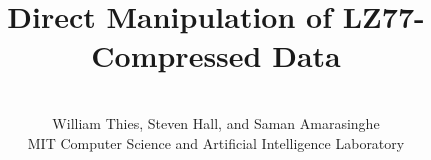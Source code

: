 \documentclass[12pt]{article}
\newcommand{\thirteenpoint}{\fontsize{13pt}{14pt}\selectfont}
\begin{document}


\title{\vspace{-40pt} \Large Direct Manipulation of LZ77-Compressed Data}



\author{\vspace{-24pt} ~ \\ \thirteenpoint William Thies, Steven Hall, and Saman Amarasinghe \\
        \thirteenpoint MIT Computer Science and Artificial Intelligence Laboratory \\ \vspace{-48pt}}

\date{}

\maketitle

\begin{abstract}

\end{abstract}




%


%


%
\enlargethispage{\baselineskip}
\setlength{\bibspacing}{0pt}
\begin{scriptsize}


\end{scriptsize}
\end{document}
